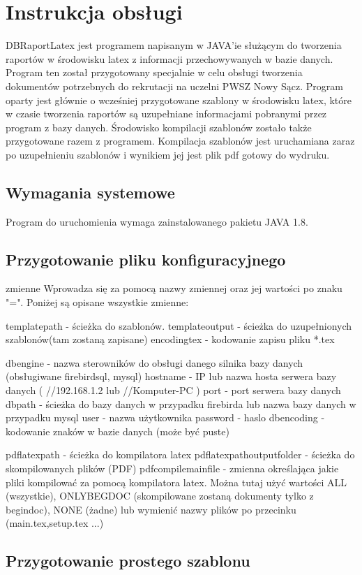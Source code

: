 \chapter{Instrukcja obsługi}
DBRaportLatex jest programem napisanym w JAVA'ie służącym do tworzenia raportów w środowisku latex z informacji przechowywanych w bazie danych.
Program ten został przygotowany specjalnie w celu obsługi tworzenia dokumentów potrzebnych do rekrutacji na uczelni PWSZ Nowy Sącz.
Program oparty jest głównie o wcześniej przygotowane szablony w środowisku latex, które w czasie tworzenia raportów są uzupełniane informacjami pobranymi przez program z bazy danych.
Środowisko kompilacji szablonów zostało także przygotowane razem z programem. Kompilacja szablonów jest uruchamiana zaraz po uzupełnieniu szablonów i wynikiem jej jest plik pdf gotowy do wydruku.
\section{Wymagania systemowe}
Program do uruchomienia wymaga zainstalowanego pakietu JAVA 1.8.
\section{Przygotowanie pliku konfiguracyjnego}
zmienne Wprowadza się  za pomocą nazwy zmiennej oraz jej wartości po znaku "=".
Poniżej są opisane wszystkie zmienne:

templatepath - ścieżka do szablonów.
templateoutput - ścieżka do uzupełnionych szablonów(tam zostaną zapisane)
encodingtex - kodowanie zapisu pliku *.tex

dbengine - nazwa sterowników do obsługi danego silnika bazy danych (obsługiwane firebirdsql, mysql)
hostname - IP lub nazwa hosta serwera bazy danych ( //192.168.1.2 lub //Komputer-PC )
port - port serwera bazy danych
dbpath - ścieżka do bazy danych w przypadku firebirda lub nazwa bazy danych w przypadku mysql
user - nazwa użytkownika
password - haslo
dbencoding - kodowanie znaków w bazie danych (może być puste)

pdflatexpath - ścieżka do kompilatora latex
pdflatexpathoutputfolder - ścieżka do skompilowanych plików (PDF)
pdfcompilemainfile - zmienna określająca jakie pliki kompilować za pomocą kompilatora latex. Można tutaj użyć wartości ALL (wszystkie), ONLYBEGDOC (skompilowane zostaną dokumenty tylko z begindoc), NONE (żadne) lub wymienić nazwy plików po przecinku (main.tex,setup.tex ...)
\section{Przygotowanie prostego szablonu}

